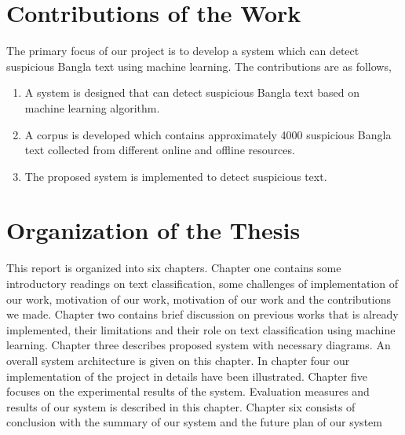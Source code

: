 \section{Contributions of the Work}
The primary focus of our project is to develop a system which can detect suspicious Bangla text using machine learning. The contributions are as follows,
\begin{enumerate}
    \item A system is designed that can detect suspicious Bangla text based on machine learning algorithm.
    
    \item A corpus is developed which contains approximately 4000 suspicious Bangla text collected from different online and offline resources.
    
    \item The proposed system is implemented to detect suspicious text.
\end{enumerate}

\section{Organization of the Thesis}
This report is organized into six chapters. Chapter one contains some introductory readings
on text classification, some challenges of implementation of our work, motivation of our work, motivation of our work and the contributions we made. Chapter two contains brief discussion on previous works that is already implemented, their limitations and their role on text classification using machine learning. Chapter three describes proposed system with necessary diagrams. An overall system architecture is given on this chapter. In chapter four our implementation of the project in details have been illustrated. Chapter five focuses on the experimental results of the system. Evaluation measures and results of our system is described in this chapter. Chapter six consists of conclusion with the summary of our system and
the future plan of our system
\clearpage